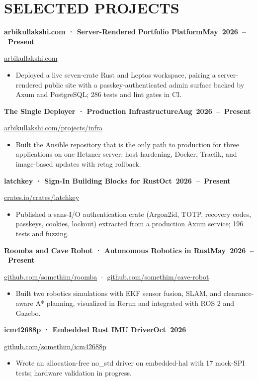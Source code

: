 \documentclass[10pt,a4paper]{article}
\newcommand{\entry}[2]{\Needspace{5\baselineskip}\par\addvspace{5pt}\noindent\textbf{#1}\hfill\mbox{\textbf{#2}}\par}
\begin{document}
\section*{SELECTED PROJECTS}
\entry{arbikullakshi.com · Server-Rendered Portfolio Platform}{May 2026 – Present}
\href{https://arbikullakshi.com}{arbikullakshi.com}\par
\begin{itemize}
  \item Deployed a live seven-crate Rust and Leptos workspace, pairing a server-rendered public site with a passkey-authenticated admin surface backed by Axum and PostgreSQL; 286 tests and lint gates in CI.
\end{itemize}
\entry{The Single Deployer · Production Infrastructure}{Aug 2026 – Present}
\href{https://arbikullakshi.com/projects/infra-88926d8d}{arbikullakshi.com/projects/infra}\par
\begin{itemize}
  \item Built the Ansible repository that is the only path to production for three applications on one Hetzner server: host hardening, Docker, Traefik, and image-based updates with retag rollback.
\end{itemize}
\entry{latchkey · Sign-In Building Blocks for Rust}{Oct 2026 – Present}
\href{https://crates.io/crates/latchkey}{crates.io/crates/latchkey}\par
\begin{itemize}
  \item Published a sans-I/O authentication crate (Argon2id, TOTP, recovery codes, passkeys, cookies, lockout) extracted from a production Axum service; 196 tests and fuzzing.
\end{itemize}
\entry{Roomba and Cave Robot · Autonomous Robotics in Rust}{May 2026 – Present}
\href{https://github.com/somethim/roomba}{github.com/somethim/roomba}  ·  \href{https://github.com/somethim/cave-robot}{github.com/somethim/cave-robot}\par
\begin{itemize}
  \item Built two robotics simulations with EKF sensor fusion, SLAM, and clearance-aware A* planning, visualized in Rerun and integrated with ROS 2 and Gazebo.
\end{itemize}
\entry{icm42688p · Embedded Rust IMU Driver}{Oct 2026}
\href{https://github.com/somethim/icm42688p}{github.com/somethim/icm42688p}\par
\begin{itemize}
  \item Wrote an allocation-free no\_std driver on embedded-hal with 17 mock-SPI tests; hardware validation in progress.
\end{itemize}
\end{document}

